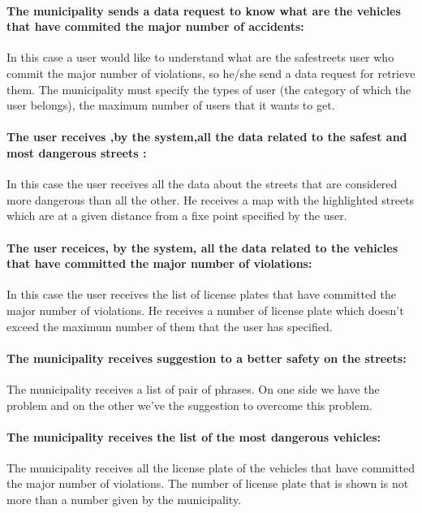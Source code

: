 \documentclass[titlepage]{article}
\begin{document}
\paragraph{The municipality sends a data request to know what 		   are the vehicles that have commited the major 	         		  number of accidents: }
In this case a user would like to understand what are the safestreets user who commit the major number of violations, so he/she send a data request for retrieve them. The municipality must specify the types of user (the category of which the user belongs), the maximum number of users that it wants to get.
\paragraph{The user receives ,by the system,all the data 			related to the safest and most dangerous streets : }
In this case the user receives all the data about the streets that are considered more dangerous than all the other. He receives a map with the highlighted streets which are at a given distance from a fixe point specified by the user.
\paragraph{The user receices, by the system, all the data related to the vehicles that have committed the major number of violations:}
In this case the user receives the list of license plates that have committed the major number of violations. He receives a number of license plate which doesn't exceed the maximum number of them that the user has specified.
\paragraph{The municipality receives suggestion to a better 			safety on the streets: }
The municipality receives a list of pair of phrases. On one side we have the problem and on the other we've the suggestion to overcome this problem.
\paragraph{The municipality receives the list of the most 			dangerous vehicles: }
The municipality receives all the license plate of the vehicles that have committed the major number of violations. The number of license plate that is shown is not more than a number given by the municipality.
\end{document}
